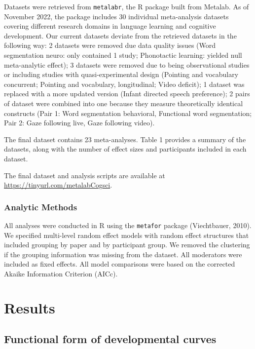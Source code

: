 \documentclass[10pt, letterpaper]{article}
\begin{document}
Datasets were retrieved from \texttt{metalabr}, the R package built from
Metalab. As of November 2022, the package includes 30 individual
meta-analysis datasets covering different research domains in language
learning and cognitive development. Our current datasets deviate from
the retrieved datasets in the following way: 2 datasets were removed due
data quality issues (Word segmentation neuro: only contained 1 study;
Phonotactic learning: yielded null meta-analytic effect); 3 datasets
were removed due to being observational studies or including studies
with quasi-experimental design (Pointing and vocabulary concurrent;
Pointing and vocabulary, longitudinal; Video deficit); 1 dataset was
replaced with a more updated version (Infant directed speech
preference); 2 pairs of dataset were combined into one because they
measure theoretically identical constructs (Pair 1: Word segmentation
behavioral, Functional word segmentation; Pair 2: Gaze following live,
Gaze following video).

The final dataset contains 23 meta-analyses. Table 1 provides a summary
of the datasets, along with the number of effect sizes and participants
included in each dataset.

The final dataset and analysis scripts are available at
\url{https://tinyurl.com/metalabCogsci}.

\hypertarget{analytic-methods}{%
\subsubsection{Analytic Methods}\label{analytic-methods}}

All analyses were conducted in R using the \texttt{metafor} package
(Viechtbauer, 2010). We specified multi-level random effect models with
random effect structures that included grouping by paper and by
participant group. We removed the clustering if the grouping information
was missing from the dataset. All moderators were included as fixed
effects. All model comparisons were based on the corrected Akaike
Information Criterion (AICc).

\hypertarget{results}{%
\section{Results}\label{results}}

\hypertarget{functional-form-of-developmental-curves}{%
\subsection{Functional form of developmental
curves}\label{functional-form-of-developmental-curves}}
\end{document}
